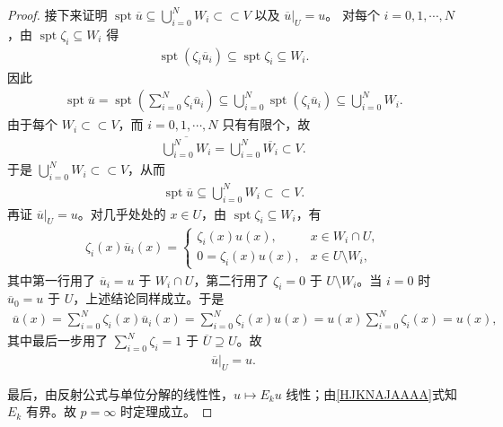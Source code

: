 \documentclass[../../main.tex]{subfiles}
\begin{document}
\begin{proof}
接下来证明 $\operatorname{spt}\overline{u}\subseteq\bigcup\limits_{i=0}^{N}W_i\subset\subset V$ 以及 $\overline{u}|_U=u$。
对每个 $i=0,1,\cdots,N$，由 $\operatorname{spt}\zeta_i\subseteq W_i$ 得
\begin{align*}
\operatorname{spt}(\zeta_i\overline{u}_i)
\subseteq\operatorname{spt}\zeta_i
\subseteq W_i.
\end{align*}
因此
\begin{align*}
\operatorname{spt}\overline{u}
=\operatorname{spt}\left(\sum\limits_{i=0}^{N}\zeta_i\overline{u}_i\right)
\subseteq\bigcup\limits_{i=0}^{N}\operatorname{spt}(\zeta_i\overline{u}_i)
\subseteq\bigcup\limits_{i=0}^{N}W_i.
\end{align*}
由于每个 $W_i\subset\subset V$，而 $i=0,1,\cdots,N$ 只有有限个，故
\begin{align*}
\overline{\bigcup\limits_{i=0}^{N}W_i}
=\bigcup\limits_{i=0}^{N}\overline{W_i}\subset V.
\end{align*}
于是 $\bigcup\limits_{i=0}^{N}W_i\subset\subset V$，从而
\begin{align*}
\operatorname{spt}\overline{u}\subseteq\bigcup\limits_{i=0}^{N}W_i\subset\subset V.
\end{align*}
再证 $\overline{u}|_U=u$。对几乎处处的 $x\in U$，由 $\operatorname{spt}\zeta_i\subseteq W_i$，有
\begin{align*}
\zeta_i(x)\overline{u}_i(x)=
\begin{cases}
\zeta_i(x)u(x), & x\in W_i\cap U,\\
0=\zeta_i(x)u(x), & x\in U\setminus W_i,
\end{cases}
\end{align*}
其中第一行用了 $\overline{u}_i=u$ 于 $W_i\cap U$，第二行用了 $\zeta_i=0$ 于 $U\setminus W_i$。当 $i=0$ 时 $\overline{u}_0=u$ 于 $U$，上述结论同样成立。于是
\begin{align*}
\overline{u}(x)
=\sum\limits_{i=0}^{N}\zeta_i(x)\overline{u}_i(x)=\sum\limits_{i=0}^{N}\zeta_i(x)u(x)=u(x)\sum\limits_{i=0}^{N}\zeta_i(x)=u(x),
\end{align*}
其中最后一步用了 $\sum\limits_{i=0}^{N}\zeta_i=1$ 于 $\overline{U}\supseteq U$。故
\begin{align*}
\overline{u}|_U=u.
\end{align*}

最后，由反射公式与单位分解的线性性，$u\mapsto E_ku$ 线性；由\eqref{HJKNAJAAAA}式知$E_k$ 有界。故 $p=\infty$ 时定理成立。
\end{proof}
\end{document}
